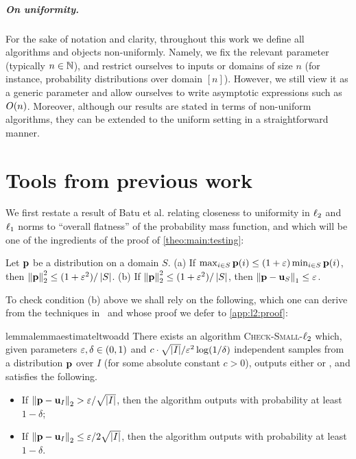 \subparagraph{On uniformity.} For the sake of notation and clarity, throughout this work we define all algorithms and objects non-uniformly. Namely, we fix the relevant parameter (typically $n\in\N$), and restrict ourselves to inputs or domains of size $n$ (for instance, probability distributions over domain $[n]$). However, we still view it as a generic parameter and allow ourselves to write asymptotic expressions such as $\bigO{n}$. Moreover, although our results are stated in terms of non-uniform algorithms, they can be extended to the uniform setting in a straightforward manner.

\section{Tools from previous work}

We first restate a result of Batu et al. relating closeness to uniformity in $\lp[2]$ and $\lp[1]$ norms to ``overall flatness'' of the probability mass function, and which will be one of the ingredients of the proof of \cref{theo:main:testing}:

\begin{lemma}\label{lemma:small:l2:close:uniform:l1}
Let $\D$ be a distribution on a domain $S$. \textsf{(a)} If $\max_{i\in S} \D(i) \leq (1+\eps)\min_{i\in S} \D(i)$, then $\normtwo{\D}^2 \leq (1+\eps^2)/\abs{S}$. \textsf{(b)} If $\normtwo{\D}^2 \leq (1+\eps^2)/\abs{S}$, then $\normone{\D-\uniform_{S}} \leq \eps$.
\end{lemma}

\noindent To check condition \textsf{(b)} above we shall rely on the following, which one can derive from the techniques in~\cite{DKN:15} and whose proof we defer to \cref{app:l2:proof}:
\
\begin{restatable}[Adapted from {\cite[Theorem 11]{DKN:15}}]{lemma}{lemmaestimateltwoadd}\label{lemma:estimate:l2:add}
There exists an algorithm \textsc{Check-Small-$\lp[2]$} which, given parameters $\eps,\delta\in(0,1)$ and $c\cdot{\sqrt{\abs{I}}}/{\eps^2} \log(1/\delta)$ independent samples from a distribution $\D$ over $I$ (for some absolute constant $c>0$), outputs either \yes or \no, and satisfies the following.
  \begin{itemize}
    \item If $\normtwo{\D-\uniform_I} > {\eps}/{\sqrt{\abs{I}}}$, then the algorithm outputs \no with probability at least $1-\delta$;
    \item If $\normtwo{\D-\uniform_I} \leq {\eps}/{2\sqrt{\abs{I}}}$, then the algorithm outputs \yes with probability at least $1-\delta$.
  \end{itemize}
\end{restatable}

